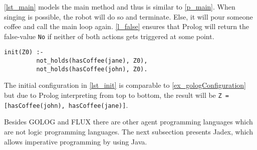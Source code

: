 \autoref{lst_main} models the main method and thus is similar to \autoref{p_main}.
When singing is possible, the robot will do so and terminate.
Else, it will pour someone coffee and call the main loop again.
\autoref{l_false} ensures that Prolog will return the false-value \texttt{No} if neither of both actions gets triggered at some point.
\begin{lstlisting}[firstnumber=17, caption={Initial configuration.}, label=lst_init]
  init(Z0) :-
         not_holds(hasCoffee(jane), Z0),
         not_holds(hasCoffee(john), Z0).
\end{lstlisting}
The initial configuration in \autoref{lst_init} is comparable to \autoref{ex_gologConfiguration} but due to Prolog interpreting from top to bottom, the result will be \texttt{Z = [hasCoffee(john), hasCoffee(jane)]}.

Besides GOLOG and FLUX there are other agent programming languages which are not logic programming languages.
The next subsection presents Jadex, which allows imperative programming by using Java.

